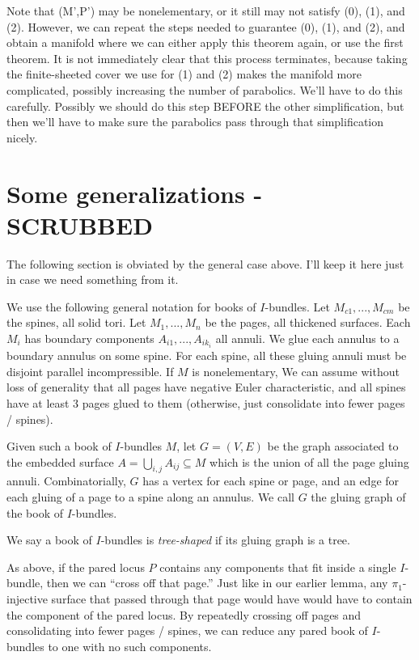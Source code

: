 \documentclass[12pt]{amsart}
\theoremstyle{definition}
\theoremstyle{remark}
\newcommand{\cin}{\subseteq}
\begin{document}
Note that (M',P') may be nonelementary, or it still may not satisfy (0), (1),
and (2).  However, we can repeat the steps needed to guarantee (0), (1), and
(2), and obtain a manifold where we can either apply this theorem again, or use
the first theorem. It is not immediately clear that this process terminates,
because taking the finite-sheeted cover we use for (1) and (2) makes the
manifold more complicated, possibly increasing the number of parabolics. We'll
have to do this carefully. Possibly we should do this step BEFORE the other
simplification, but then we'll have to make sure the parabolics pass through
that simplification nicely.

\section{Some generalizations - SCRUBBED}

The following section is obviated by the general case above. I'll keep it here
just in case we need something from it.

We use the following general notation for books of $I$-bundles. Let
$M_{c1},...,M_{cm}$ be the spines, all solid tori. Let $M_1,...,M_n$ be the
pages, all thickened surfaces. Each $M_i$ has boundary components
$A_{i1},...,A_{ik_i}$ all annuli. We glue each annulus to a boundary annulus on
some spine. For each spine, all these gluing annuli must be disjoint parallel
incompressible. If $M$ is nonelementary, We can assume without loss of
generality that all pages have negative Euler characteristic, and all spines
have at least 3 pages glued to them (otherwise, just consolidate into fewer
pages / spines).

Given such a book of $I$-bundles $M$, let $G=(V,E)$ be the graph associated to
the embedded surface $A = \bigcup_{i,j} A_{ij} \cin M$ which is the union of
all the page gluing annuli. Combinatorially, $G$ has a vertex for each spine or
page, and an edge for each gluing of a page to a spine along an annulus. We
call $G$ the gluing graph of the book of $I$-bundles.

We say a book of $I$-bundles is \emph{tree-shaped} if its gluing graph is
a tree.

As above, if the pared locus $P$ contains any components that fit inside
a single $I$-bundle, then we can ``cross off that page.'' Just like in our
earlier lemma, any $\pi_1$-injective surface that passed through that page
would have would have to contain the component of the pared locus. By
repeatedly crossing off pages and consolidating into fewer pages / spines, we
can reduce any pared book of $I$-bundles to one with no such components.
\end{document}
